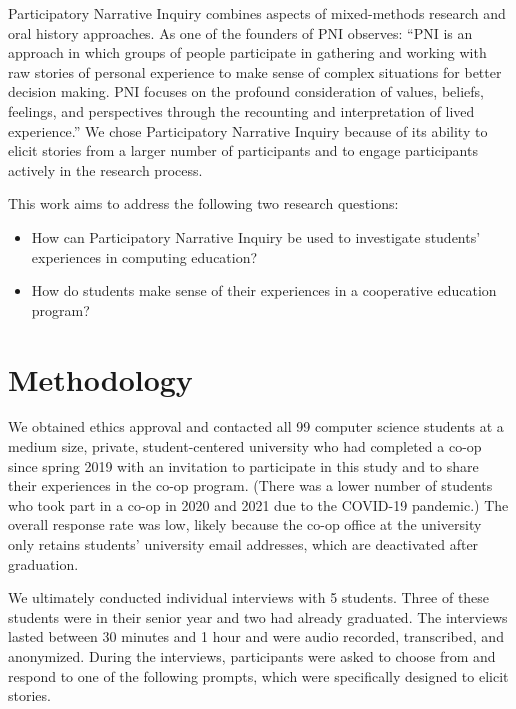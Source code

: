 \documentclass{article}
\begin{document}
Participatory Narrative Inquiry combines aspects of mixed-methods research and oral history approaches. As one of the founders of PNI observes: “PNI is an approach in which groups of people participate in gathering and working with raw stories of personal experience to make sense of complex situations for better decision making. PNI focuses on the profound consideration of values, beliefs, feelings, and perspectives through the recounting and interpretation of lived experience.” \cite{kurtzWorkingStoriesYour2014} We chose Participatory Narrative Inquiry because of its ability to elicit stories from a larger number of participants and to engage participants actively in the research process.
	
This work aims to address the following two research questions:

\begin{itemize}
    \item How can Participatory Narrative Inquiry be used to investigate students’ experiences in computing education?
    \item How do students make sense of their experiences in a cooperative education program?
\end{itemize}

\section{Methodology}
We obtained ethics approval and contacted all 99 computer science students at a medium size, private, student-centered university who had completed a co-op since spring 2019 with an invitation to participate in this study and to share their experiences in the co-op program. (There was a lower number of students who took part in a co-op in 2020 and 2021 due to the COVID-19 pandemic.) The overall response rate was low, likely because the co-op office at the university only retains students’ university email addresses, which are deactivated after graduation.

We ultimately conducted individual interviews with 5 students. Three of these students were in their senior year and two had already graduated. The interviews lasted between 30 minutes and 1 hour and were audio recorded, transcribed, and anonymized. During the interviews, participants were asked to choose from and respond to one of the following prompts, which were specifically designed to elicit stories.
\end{document}
